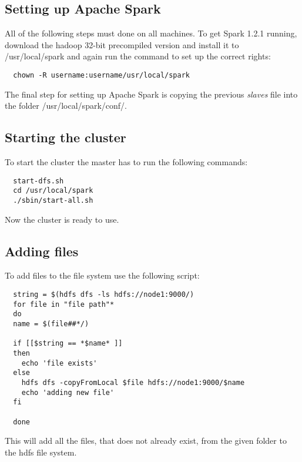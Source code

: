 \subsection{Setting up Apache Spark}
All of the following steps must done on all machines. To get Spark 1.2.1 running, download the hadoop 32-bit precompiled version and install it to \textsf{/usr/local/spark} and again run the command to set up the correct rights:
\begin{lstlisting}
  chown -R username:username/usr/local/spark
\end{lstlisting}
The final step for setting up Apache Spark is copying the previous \emph{slaves} file into the folder \textsf{/usr/local/spark/conf/}.

\subsection{Starting the cluster}
To start the cluster the master has to run the following commands:
\begin{verbatim}
  start-dfs.sh
  cd /usr/local/spark
  ./sbin/start-all.sh
\end{verbatim}
Now the cluster is ready to use.

\subsection{Adding files}
To add files to the file system use the following script:
\begin{verbatim}
  string = $(hdfs dfs -ls hdfs://node1:9000/)
  for file in "file path"*
  do
  name = $(file##*/)

  if [[$string == *$name* ]]
  then
    echo 'file exists'
  else
    hdfs dfs -copyFromLocal $file hdfs://node1:9000/$name
    echo 'adding new file'
  fi 

  done
  \end{verbatim}
This will add all the files, that does not already exist, from the given folder to the hdfs file system.


